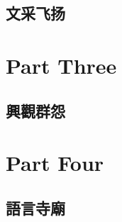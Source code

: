 \documentclass[11pt,fleqn]{book} %
\begin{document}


\chapter{ 文采飞扬}




\part{Part Three}




\chapter{ 興觀群怨}
















\part{Part Four}
\chapter{ 語言寺廟}


























\end{document}
